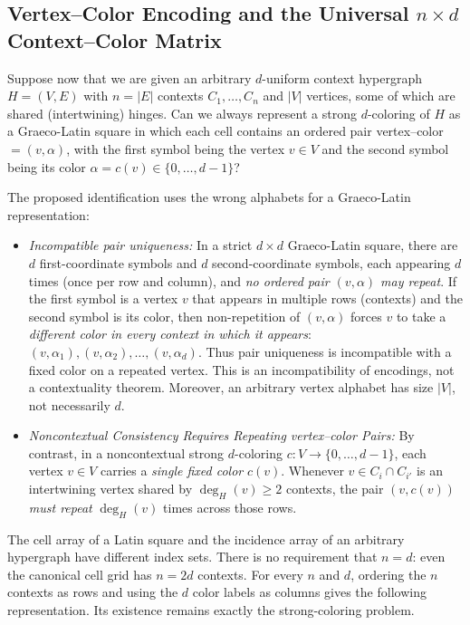 \documentclass[aps,pra,reprint,superscriptaddress,longbibliography,nofootinbib,floatfix,10pt]{revtex4-2}
\theoremstyle{definition}\newtheorem{definition}[theorem]{Definition}
\theoremstyle{remark}\newtheorem{remark}[theorem]{Remark}
\begin{document}
\subsection{Vertex--Color Encoding and the Universal \texorpdfstring{$n\times d$}{n x d} Context--Color Matrix}\label{sec:nxd-matrix}

Suppose now that we are given an arbitrary $d$-uniform context hypergraph $H=(V,E)$ with $n=|E|$ contexts $C_1,\ldots,C_n$ and $|V|$ vertices, some of which are shared (intertwining) hinges. Can we always represent a strong $d$-coloring of $H$ as a Graeco-Latin square in which each cell contains an ordered pair vertex--color $=(v,\alpha)$, with the first symbol being the vertex $v\in V$ and the second symbol being its color $\alpha=c(v)\in\{0,\ldots,d-1\}$?

The proposed identification uses the wrong alphabets for a Graeco-Latin representation:
\begin{itemize}
\item \emph{Incompatible pair uniqueness:} In a strict $d\times d$ Graeco-Latin square, there are $d$ first-coordinate symbols and $d$ second-coordinate symbols, each appearing $d$ times (once per row and column), and \emph{no ordered pair $(v,\alpha)$ may repeat}. If the first symbol is a vertex $v$ that appears in multiple rows (contexts) and the second symbol is its color, then non-repetition of $(v,\alpha)$ forces $v$ to take a \emph{different color in every context in which it appears}: $(v,\alpha_1),(v,\alpha_2),\ldots,(v,\alpha_d)$. Thus pair uniqueness is incompatible with a fixed color on a repeated vertex. This is an incompatibility of encodings, not a contextuality theorem. Moreover, an arbitrary vertex alphabet has size $|V|$, not necessarily $d$.
\item \emph{Noncontextual Consistency Requires Repeating vertex--color Pairs:} By contrast, in a noncontextual strong $d$-coloring $c:V\to\{0,\ldots,d-1\}$, each vertex $v\in V$ carries a \emph{single fixed color} $c(v)$. Whenever $v\in C_i\cap C_{i'}$ is an intertwining vertex shared by $\deg_H(v)\ge 2$ contexts, the pair $(v,c(v))$ \emph{must repeat} $\deg_H(v)$ times across those rows.
\end{itemize}

The cell array of a Latin square and the incidence array of an arbitrary hypergraph have different index sets. There is no requirement that $n=d$: even the canonical cell grid has $n=2d$ contexts. For every $n$ and $d$, ordering the $n$ contexts as rows and using the $d$ color labels as columns gives the following representation. Its existence remains exactly the strong-coloring problem.
\end{document}

